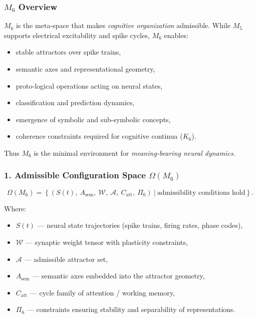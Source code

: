 

\subsubsection{\texorpdfstring{$M_6$}{M_6} Overview}
\label{sec:m6-overview}

$M_6$ is the meta-space that makes \emph{cognitive organization} admissible.
While $M_5$ supports electrical excitability and spike cycles, $M_6$ enables:

\begin{itemize}
    \item stable attractors over spike trains,
    \item semantic axes and representational geometry,
    \item proto-logical operations acting on neural states,
    \item classification and prediction dynamics,
    \item emergence of symbolic and sub-symbolic concepts,
    \item coherence constraints required for cognitive continua ($K_6$).
\end{itemize}

Thus $M_6$ is the minimal environment for \emph{meaning-bearing neural dynamics}.

\subsubsection*{1. Admissible Configuration Space \texorpdfstring{$\Omega(M_6)$}{\Omega(M_6)}}

\[
\Omega(M_6) =
\left\{
(S(t),\ A_{\mathrm{sem}},\
\mathcal{W},\
\mathcal{A},\
C_{\mathrm{att}},\
\Pi_6)
\ \big|\ \text{admissibility conditions hold}
\right\}.
\]

Where:

\begin{itemize}
    \item $S(t)$ — neural state trajectories (spike trains, firing rates, phase codes),
    \item $\mathcal{W}$ — synaptic weight tensor with plasticity constraints,
    \item $\mathcal{A}$ — admissible attractor set,
    \item $A_{\mathrm{sem}}$ — semantic axes embedded into the attractor geometry,
    \item $C_{\mathrm{att}}$ — cycle family of attention / working memory,
    \item $\Pi_6$ — constraints ensuring stability and separability of representations.
\end{itemize}

